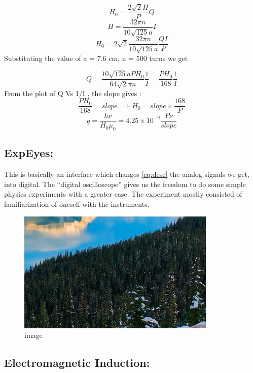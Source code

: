 \documentclass{../_layouts/ieeeconf}
\begin{document}
\[ H_0 = \frac{2\sqrt{2}H}{P}Q \]
\[ H=\frac{32\pi n}{10\sqrt{125}a}I \]
\[ H_0=2\sqrt{2}\frac{32\pi n}{10\sqrt{125}a}\frac{QI}{P} \]
Substituting the value of a = 7.6 cm, n = 500 turns we get

\begin{equation} Q=\frac{10\sqrt{125}a PH_0}{64\sqrt{2}\pi n }\frac{1}{I}=\frac{PH_0}{168}\frac{1}{I} \label{eq:desc}\end{equation}
From the plot of Q Vs 1/I , the slope gives :
\[ \frac{PH_0}{168}=slope \implies H_0=slope \times \frac{168}{P} \]
\[ g=\frac{h \nu}{H_0 \mu_0} = 4.25\times10^{-9} \frac{P \nu}{slope} \]

\subsection{ExpEyes:}

This is basically an interface which changes \ref{eq:desc} the analog signals we get, into digital. The ``digital oscilloscope'' gives us the freedom to do some simple physics experiments with a greater ease. The experiment mostly consisted of familiarization of oneself with the instruments.

\begin{figure}[H]
\centering
\includegraphics[width = \columnwidth]{../_assets/image.png}
\caption{image}
\label{fig:image}
\end{figure}

\subsection{Electromagnetic Induction:}
\end{document}
